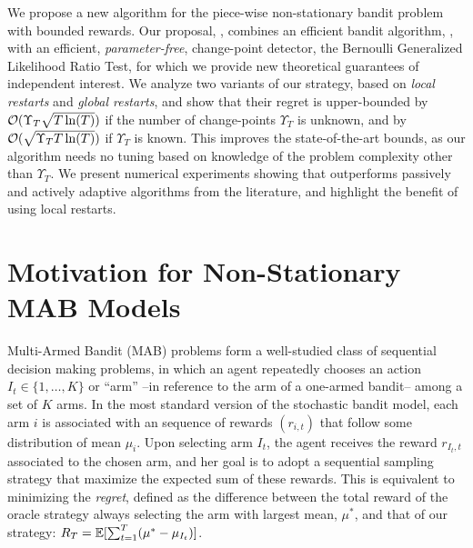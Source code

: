 

We propose a new algorithm for the piece-wise \iid{} non-stationary bandit problem with bounded rewards.
Our proposal, \GLRklUCB, combines an efficient bandit algorithm, \klUCB, with an efficient, \emph{parameter-free}, change-point detector, the Bernoulli Generalized Likelihood Ratio Test, for which we provide new theoretical guarantees of independent interest. We analyze two variants of our strategy, based on \emph{local restarts} and \emph{global restarts}, and show that their regret is upper-bounded by  $\mathcal{O}(\Upsilon_T \sqrt{T \ln(T)})$ if the number of change-points $\Upsilon_T$ is unknown, and by $\mathcal{O}(\sqrt{\Upsilon_T T \ln(T)})$ if $\Upsilon_T$ is known.
This improves the state-of-the-art bounds, as our algorithm needs no tuning based on knowledge of the problem complexity other than $\Upsilon_T$.
We present numerical experiments showing that \GLRklUCB{} outperforms passively and actively adaptive algorithms from the literature, and highlight the benefit of using local restarts.


\section{Motivation for Non-Stationary MAB Models}
\label{sec:6:Introduction}

Multi-Armed Bandit (MAB) problems form a well-studied class of sequential decision making problems, in which an agent repeatedly chooses an action $I_t \in\{1,\dots,K\}$ or ``arm'' --in reference to the arm of a one-armed bandit-- among a set of $K$ arms. In the most standard version of the stochastic bandit model, each arm $i$ is associated with an \iid{} sequence of rewards $(r_{i,t})$ that follow some distribution of mean $\mu_i$. Upon selecting arm $I_t$, the agent receives the reward $r_{I_t,t}$ associated to the chosen arm, and her goal is to adopt a sequential sampling strategy that maximize the expected sum of these rewards. This is equivalent to minimizing the \emph{regret}, defined as the difference between the total reward of the oracle strategy always selecting the arm with largest mean, $\mu^*$, and that of our strategy: $R_T = \mathbb{E}[\sum_{t=1}^T(\mu^* - \mu_{I_t})]$.

